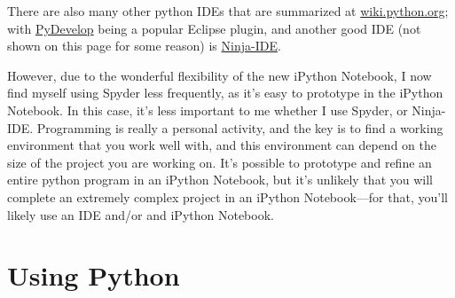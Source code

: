 There are also many other python IDEs that are summarized at \href{http://wiki.python.org/moin/IntegratedDevelopmentEnvironments}{wiki.python.org}; with \href{http://wiki.python.org/moin/PyDev}{PyDevelop} being a popular Eclipse plugin, and another good IDE (not shown on this page for some reason) is \href{http://ninja-ide.org/}{Ninja-IDE}.

However, due to the wonderful flexibility of the new iPython Notebook, I now find myself using Spyder less frequently, as it's easy to prototype in the iPython Notebook. In this case, it's less important to me whether I use Spyder, or Ninja-IDE. 
Programming is really a personal activity, and the key is to find a working environment that you work well with, and this environment can depend on the size of the project you are working on. It's possible to prototype and refine an entire python program in an iPython Notebook, but it's unlikely that you will complete an extremely complex project in an iPython Notebook---for that, you'll likely use an IDE and/or and iPython Notebook.


\section{Using Python}
